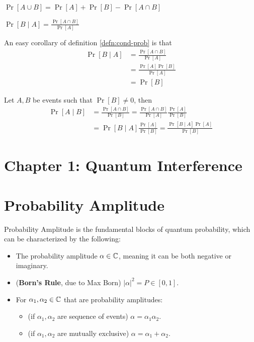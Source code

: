 \documentclass[12pt]{article}
\begin{document}
\begin{proposition}[PIE]
$\Pr[A\cup B] = \Pr[A] + \Pr[B] - \Pr[A\cap B]$
\end{proposition}

\begin{definition}\label{defn:cond-prob}
$\Pr[B\mid A] = \frac{\Pr[A\cap B]}{\Pr[A]}$
\end{definition}

\begin{corollary}
An easy corollary of definition \ref{defn:cond-prob} is that $$
\begin{aligned}
\Pr[B\mid A]
    &= \frac{\Pr[A\cap B]}{\Pr[A]}\\
    &= \frac{\Pr[A]\Pr[B]}{\Pr[A]}\\
    &= \Pr[B]
\end{aligned}
$$
\end{corollary}

\begin{theorem}
Let $A,B$ be events such that $\Pr[B]\neq 0$, then $$
\begin{aligned}
\Pr[A\mid B]
    &= \frac{\Pr[A\cap B]}{\Pr[B]} = \frac{\Pr[A\cap B]}{\Pr[A]}\frac{\Pr[A]}{\Pr[B]}\\
    &= \Pr[B\mid A]\frac{\Pr[A]}{\Pr[B]} = \frac{\Pr[B\mid A]\Pr[A]}{\Pr[B]}
\end{aligned}
$$
\end{theorem}
\newpage

\setcounter{section}{0}
\section*{Chapter 1: Quantum Interference}
\section{Probability Amplitude}
\begin{definition}\label{defn:prob-amp}
Probability Amplitude is the fundamental blocks of quantum probability, which can be characterized by the following:
\begin{itemize}
    \item The probability amplitude $\alpha\in {\mathbb C}$, meaning it can be both negative or imaginary.
    \item (\textbf{Born's Rule}, due to Max Born) $|\alpha|^2 = P\in [0,1]$.
    \item For $\alpha_1, \alpha_2\in {\mathbb C}$ that are probability amplitudes:
    \begin{itemize}
        \item (if $\alpha_1, \alpha_2$ are sequence of events) $\alpha = \alpha_1\alpha_2$.
        \item (if $\alpha_1, \alpha_2$ are mutually exclusive) $\alpha = \alpha_1 + \alpha_2$.
    \end{itemize}
\end{itemize}
\end{definition}
\end{document}
